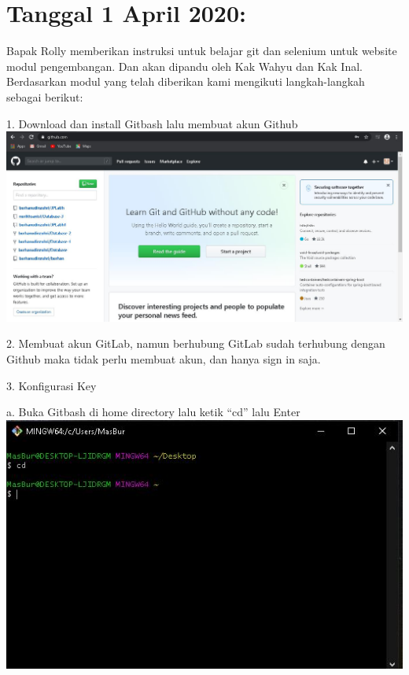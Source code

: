 \documentclass{article}
\begin{document}
\section{Tanggal 1 April 2020:}
Bapak Rolly memberikan instruksi untuk belajar git dan selenium untuk website modul pengembangan. Dan akan dipandu oleh Kak Wahyu dan Kak Inal. Berdasarkan modul yang telah diberikan kami mengikuti langkah-langkah sebagai berikut:
    \newline
    \newline
        \item 1.	Download dan install  Gitbash lalu membuat akun Github
            \newline
            \includegraphics[scale=0.3]{32.1.jpg}
            \newline
        \item 2.	Membuat akun GitLab, namun berhubung GitLab sudah terhubung dengan Github maka tidak perlu membuat akun, dan hanya sign in saja.
        \newline
            \item 3.	Konfigurasi Key
                \newline
            \item a. Buka Gitbash di home directory lalu ketik “cd” lalu Enter
                \newline
                \includegraphics[scale=0.5]{32.3a.jpg}
\end{document}
